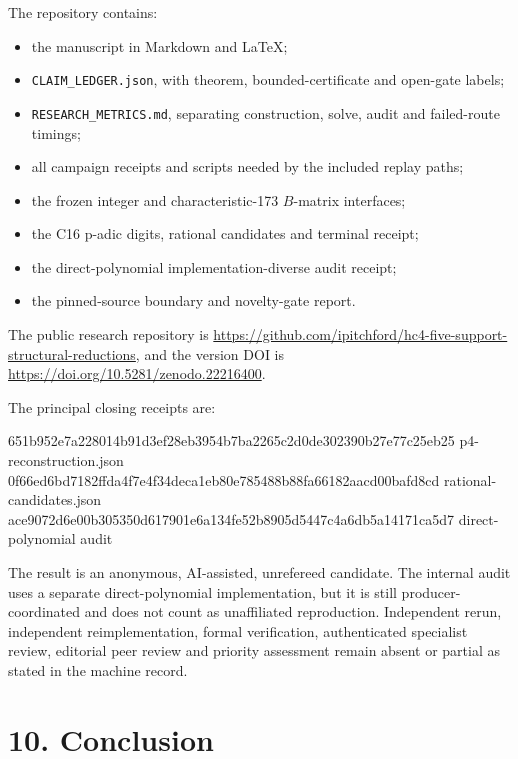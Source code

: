 \documentclass[
  11pt,
]{article}
\newenvironment{Shaded}{}{}
\newcommand{\NormalTok}[1]{#1}
\providecommand{\tightlist}{%
  \setlength{\itemsep}{0pt}\setlength{\parskip}{0pt}}
\begin{document}
The repository contains:

\begin{itemize}
\tightlist
\item
  the manuscript in Markdown and LaTeX;
\item
  \texttt{CLAIM\_LEDGER.json}, with theorem, bounded-certificate and
  open-gate labels;
\item
  \texttt{RESEARCH\_METRICS.md}, separating construction, solve, audit
  and failed-route timings;
\item
  all campaign receipts and scripts needed by the included replay paths;
\item
  the frozen integer and characteristic-173 \(B\)-matrix interfaces;
\item
  the C16 p-adic digits, rational candidates and terminal receipt;
\item
  the direct-polynomial implementation-diverse audit receipt;
\item
  the pinned-source boundary and novelty-gate report.
\end{itemize}

The public research repository is
\url{https://github.com/ipitchford/hc4-five-support-structural-reductions},
and the version DOI is \url{https://doi.org/10.5281/zenodo.22216400}.

The principal closing receipts are:

\begin{Shaded}
\begin{Highlighting}[]
\NormalTok{651b952e7a228014b91d3ef28eb3954b7ba2265c2d0de302390b27e77c25eb25  p4{-}reconstruction.json}
\NormalTok{0f66ed6bd7182ffda4f7e4f34deca1eb80e785488b88fa66182aacd00bafd8cd  rational{-}candidates.json}
\NormalTok{ace9072d6e00b305350d617901e6a134fe52b8905d5447c4a6db5a14171ca5d7  direct{-}polynomial audit}
\end{Highlighting}
\end{Shaded}

The result is an anonymous, AI-assisted, unrefereed candidate. The
internal audit uses a separate direct-polynomial implementation, but it
is still producer-coordinated and does not count as unaffiliated
reproduction. Independent rerun, independent reimplementation, formal
verification, authenticated specialist review, editorial peer review and
priority assessment remain absent or partial as stated in the machine
record.

\section{10. Conclusion}\label{conclusion}
\end{document}

